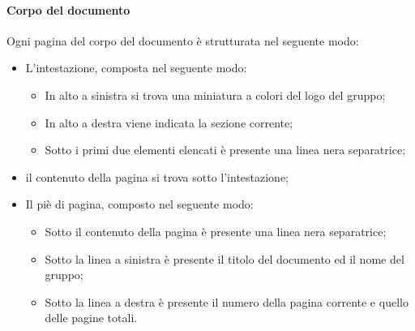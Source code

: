 {\paragraph{Corpo del documento}       
Ogni pagina del corpo del documento è strutturata nel seguente modo:
\begin{itemize}
	\item L'intestazione, composta nel seguente modo:
	\begin{itemize}
		\item In alto a sinistra si trova una miniatura a colori del logo del gruppo;	
		\item In alto a destra viene indicata la sezione corrente;
		\item Sotto i primi due elementi elencati è presente una 	linea nera separatrice;
	\end{itemize}		
	\item il contenuto della pagina si trova sotto l'intestazione;	
	\item Il piè di pagina, composto nel seguente modo:	
	\begin{itemize}	
		\item Sotto il contenuto della pagina è presente una linea nera separatrice;
		\item Sotto la linea a sinistra è presente il titolo del documento ed il nome del gruppo;
		\item Sotto la linea a destra è presente il numero della pagina corrente e quello delle pagine totali.		
	\end{itemize}
\end{itemize}
}
